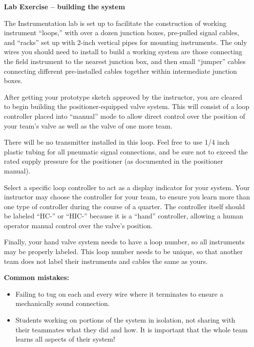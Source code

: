 \begin{itemize}
\vfil \eject

\noindent
{\bf Lab Exercise -- building the system}

\vskip 5pt

The Instrumentation lab is set up to facilitate the construction of working instrument ``loops,'' with over a dozen junction boxes, pre-pulled signal cables, and ``racks'' set up with 2-inch vertical pipes for mounting instruments.  The only wires you should need to install to build a working system are those connecting the field instrument to the nearest junction box, and then small ``jumper'' cables connecting different pre-installed cables together within intermediate junction boxes.

After getting your prototype sketch approved by the instructor, you are cleared to begin building the positioner-equipped valve system.  This will consist of a loop controller placed into ``manual'' mode to allow direct control over the position of your team's valve as well as the valve of one more team.  

There will be no transmitter installed in this loop.  Feel free to use 1/4 inch plastic tubing for all pneumatic signal connections, and be sure not to exceed the rated supply pressure for the positioner (as documented in the positioner manual).

Select a specific loop controller to act as a display indicator for your system.  Your instructor may choose the controller for your team, to ensure you learn more than one type of controller during the course of a quarter.  The controller itself should be labeled ``HC-'' or ``HIC-'' because it is a ``hand'' controller, allowing a human operator manual control over the valve's position. 

Finally, your hand valve system needs to have a loop number, so all instruments may be properly labeled.  This loop number needs to be unique, so that another team does not label their instruments and cables the same as yours.  

\vskip 10pt

{\bf Common mistakes:}

\begin{itemize}
\item{} Failing to tug on each and every wire where it terminates to ensure a mechanically sound connection.
\item{} Students working on portions of the system in isolation, not sharing with their teammates what they did and how.  It is important that the whole team learns all aspects of their system!
\end{itemize}


\end{itemize}
